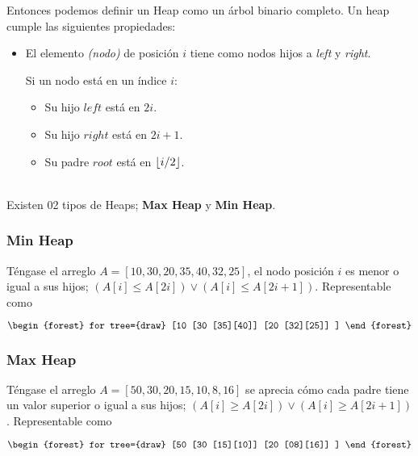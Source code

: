 \documentclass[tikz,11pt,fleqn]{book} %
\begin{document}
Entonces podemos definir un Heap como un árbol binario completo.
Un heap cumple las siguientes propiedades:
\begin{itemize}
	\item El elemento \textit{(nodo)} de posición $i$ tiene como nodos hijos a \textit{left} y \textit{right}.

	      Si un nodo está en un índice $i$:
	      \begin{itemize}
		      \item Su hijo $left$ está en $2i$.
		      \item Su hijo $right$ está en $2i+1$.
		      \item Su padre $root$ está en $\left\lfloor i/2 \right\rfloor$.
	      \end{itemize}
\end{itemize}~\\
Existen 02 tipos de Heaps; \textbf{Max Heap} y \textbf{Min Heap}.

\subsubsection{Min Heap}
Téngase el arreglo $A=[10,30,20,35,40,32,25]$, el nodo posición $i$ es menor o igual a sus hijos; $(A[i] \le A[2i]) \lor (A[i] \le A[2i+1])$. Representable como

$$\begin{forest}
		for tree={draw}
		[10
			[30
					[35][40]]
			[20
					[32][25]]
		]
	\end{forest}$$

\subsubsection{Max Heap}
Téngase el arreglo $A=[50,30,20,15,10,8,16]$ se aprecia cómo cada padre tiene un valor superior o igual a sus hijos; $(A[i] \ge A[2i]) \lor (A[i] \ge A[2i+1])$. Representable como

$$\begin{forest}
		for tree={draw}
		[50
			[30
					[15][10]]
			[20
					[08][16]]
		]
	\end{forest}$$
\end{document}
